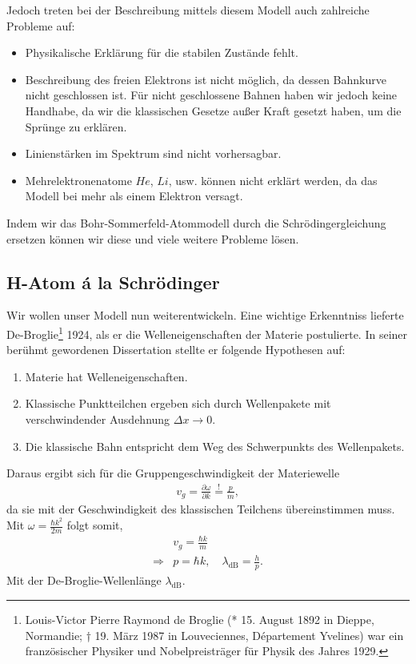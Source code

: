 Jedoch treten bei der Beschreibung mittels diesem Modell auch zahlreiche
Probleme auf:
\begin{itemize}
  \item Physikalische Erklärung für die stabilen Zustände fehlt.
  \item Beschreibung des freien Elektrons ist nicht möglich, da dessen
  Bahnkurve nicht geschlossen ist. Für nicht geschlossene Bahnen haben wir
  jedoch keine Handhabe, da wir die klassischen Gesetze außer Kraft gesetzt
  haben, um die Sprünge zu erklären.
  \item Linienstärken im Spektrum sind nicht vorhersagbar.
  \item Mehrelektronenatome $He$, $Li$, usw. können nicht erklärt werden, da
  das Modell bei mehr als einem Elektron versagt.
\end{itemize}

Indem wir das Bohr-Sommerfeld-Atommodell durch die Schrödingergleichung
ersetzen können wir diese und viele weitere Probleme lösen.

\subsection{H-Atom á la Schrödinger}

Wir wollen unser Modell nun weiterentwickeln. Eine wichtige Erkenntniss
lieferte De-Broglie\footnote{Louis-Victor Pierre Raymond de Broglie (* 15.
August 1892 in Dieppe, Normandie; † 19. März 1987 in Louveciennes, Département
Yvelines) war ein französischer Physiker und Nobelpreisträger für Physik des
Jahres 1929.} 1924, als er die Welleneigenschaften der Materie postulierte. In
seiner berühmt gewordenen Dissertation stellte er folgende Hypothesen auf:
\begin{enumerate}[label=(\roman{*})]
  \item Materie hat Welleneigenschaften.
  \item Klassische Punktteilchen ergeben sich durch Wellenpakete mit
  verschwindender Ausdehnung $\Delta x \to 0$.
  \item Die klassische Bahn entspricht dem Weg des Schwerpunkts des
  Wellenpakets.
\end{enumerate}
Daraus ergibt sich für die Gruppengeschwindigkeit der Materiewelle
\begin{align*}
v_g = \frac{\partial \omega}{\partial k} \overset{!}{=} \frac{p}{m},
\end{align*}
da sie mit der Geschwindigkeit des klassischen Teilchens übereinstimmen muss.
Mit $\omega = \frac{\hbar k^2}{2m}$ folgt somit,
\begin{align*}
&v_g = \frac{\hbar k}{m}\\
\Rightarrow & p = \hbar k,\quad \lambda_\text{dB} = \frac{h}{p}.
\end{align*}
Mit der De-Broglie-Wellenlänge $\lambda_\text{dB}$.

